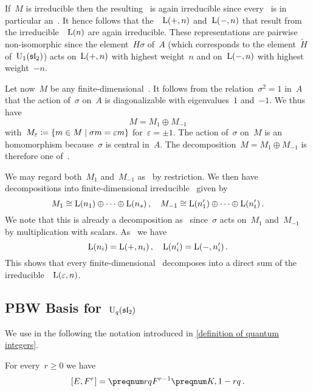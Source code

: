 \documentclass[a4paper, 11pt, oneside]{scrartcl}
\begin{document}
If~$M$ is irreducible then the resulting~ is again irreducible since every~ is in particular an~.
It hence follows that the~~$\operatorname{L}(+,n)$ and~$\operatorname{L}(-,n)$ that result from the irreducible~~$\operatorname{L}(n)$ are again irreducible.
These representations are pairwise non-isomorphic since the element~$H \sigma$ of~$A$ (which corresponds to the element~$\widetilde{H}$ of~$\operatorname{U}_1(\mathfrak{sl}_2)$) acts on~$\operatorname{L}(+,n)$ with highest weight~$n$ and on~$\operatorname{L}(-,n)$ with highest weight~$-n$.

Let now~$M$ be any finite-dimensional~.
It follows from the relation~$\sigma^2 = 1$ in~$A$ that the action of~$\sigma$ on~$A$ is diagonalizable with eigenvalues~$1$ and~$-1$.
We thus have
\[
  M = M_{1} \oplus M_{-1}
\]
with~$M_\varepsilon \defined \{ m \in M \suchthat \sigma m = \varepsilon m \}$ for~$\varepsilon = \pm 1$.
The action of~$\sigma$ on~$M$ is an~ homomorphism because~$\sigma$ is central in~$A$.
The decomposition~$M = M_{1} \oplus M_{-1}$ is therefore one of~.

We may regard both~$M_1$ and~$M_{-1}$ as~ by restriction.
We then have decompositions into finite-dimensional irreducible~ given by
\[
  M_1
  \cong
  \operatorname{L}(n_1) \oplus \dotsb \oplus \operatorname{L}(n_s) \,,
  \quad
  M_{-1}
  \cong
  \operatorname{L}(n'_1) \oplus \dotsb \oplus \operatorname{L}(n'_t) \,.
\]
We note that this is already a decomposition as~ since~$\sigma$ acts on~$M_1$ and~$M_{-1}$ by multiplication with scalars.
As~ we have
\[
  \operatorname{L}(n_i) = \operatorname{L}(+, n_i) \,,
  \quad
  \operatorname{L}(n'_i) = \operatorname{L}(-, n'_i) \,.
\]
This shows that every finite-dimensional~ decomposes into a direct sum of the irreducible~~$\operatorname{L}(\varepsilon, n)$.




\subsection{PBW Basis for~$\operatorname{U}_q(\mathfrak{sl}_2)$}
\label{proof of quantum pbw}

We use in the following the notation introduced in \cref{definition of quantum integers}.

\begin{lemma}
  \label{generalized commutator relation for E and F}
  For every~$r \geq 0$ we have
  \[
    [E, F^r]
    =
    \qnum{r} F^{r-1} \qnum{K, 1-r} \,.
  \]
\end{lemma}
\end{document}
